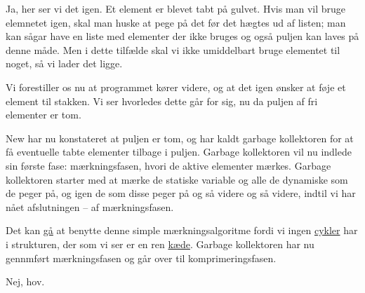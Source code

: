\documentclass[a4paper,11pt]{article}
\begin{document}
\begin{sketch}



 Ja, her ser vi det igen. Et element er blevet tabt på gulvet. Hvis man
vil bruge elemnetet igen, skal man huske at pege på det før det hægtes ud af
listen; man kan sågar have en liste med elementer der ikke bruges og også puljen
kan laves på denne måde. Men i dette tilfælde skal vi ikke umiddelbart bruge
elementet til noget, så vi lader det ligge.

Vi forestiller os nu at programmet kører videre, og at det igen ønsker at føje
et element til stakken. Vi ser hvorledes dette går for sig, nu da puljen af fri
elementer er tom.


 New har nu konstateret at puljen er tom, og har kaldt garbage
kollektoren for at få eventuelle tabte elementer tilbage i puljen. Garbage
kollektoren vil nu indlede sin første fase: mærkningsfasen, hvori de aktive
elementer mærkes. Garbage kollektoren starter med at mærke de statiske variable
og alle de dynamiske som de peger på, og igen de som disse peger på og så videre
og så videre, indtil vi har nået afslutningen -- af mærkningsfasen.


 Det kan \underline{gå} at benytte denne simple mærkningsalgoritme fordi
vi ingen \underline{cykler} har i strukturen, der som vi ser er en ren
\underline{kæde}. Garbage kollektoren har nu gennmført mærkningsfasen og går
over til komprimeringsfasen.


 Nej, hov.



\end{sketch}
\end{document}
